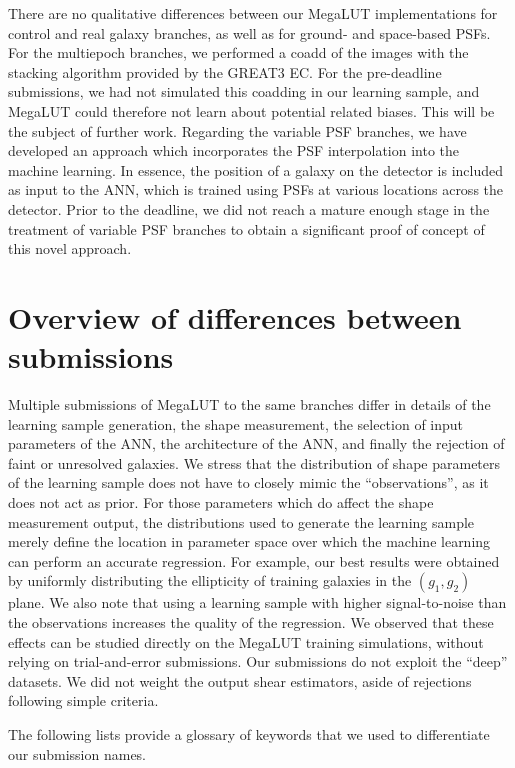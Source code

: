 \documentclass[a4paper,11pt]{scrartcl}
\begin{document}
There are no qualitative differences between our MegaLUT implementations for control and real galaxy branches, as well as for ground- and space-based PSFs. For the multiepoch branches, we performed a coadd of the images with the stacking algorithm provided by the GREAT3 EC. For the pre-deadline submissions, we had not simulated this coadding in our learning sample, and MegaLUT could therefore not learn about potential related biases. This will be the subject of further work. Regarding the variable PSF branches, we have developed an approach which incorporates the PSF interpolation into the machine learning. In essence, the position of a galaxy on the detector is included as input to the ANN, which is trained using PSFs at various locations across the detector. Prior to the deadline, we did not reach a mature enough stage in the treatment of variable PSF branches to obtain a significant proof of concept of this novel approach.

\section{Overview of differences between submissions}

Multiple submissions of MegaLUT to the same branches differ in details of the learning sample generation,
the shape measurement, the selection of input parameters of the ANN, the architecture of the ANN, and finally the rejection of faint or unresolved galaxies. We stress that the distribution of shape parameters of the learning sample does not have to closely mimic the ``observations'', as it does not act as prior. For those parameters which do affect the shape measurement output, the distributions used to generate the learning sample merely define the location in parameter space over which the machine learning can perform an accurate regression. For example, our best results were obtained by uniformly distributing the ellipticity of training galaxies in the $(g_1, g_2)$ plane. We also note that using a learning sample with higher signal-to-noise than the observations increases the quality of the regression. We observed that these effects can be studied directly on the MegaLUT training simulations, without relying on trial-and-error submissions. Our submissions do not exploit the ``deep'' datasets. We did not weight the output shear estimators, aside of rejections following simple criteria.

The following lists provide a glossary of keywords that we used to differentiate our submission names.
\end{document}
